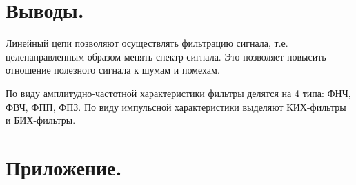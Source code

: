 \documentclass[a4paper,14pt]{extarticle}
\begin{document}

\section{Выводы.}

Линейный цепи позволяют осуществлять фильтрацию сигнала, т.е. целенаправленным образом менять спектр сигнала. Это позволяет повысить отношение полезного сигнала к шумам и помехам.

По виду амплитудно-частотной характеристики фильтры делятся на 4 типа: ФНЧ, ФВЧ, ФПП, ФПЗ.
По виду импульсной характеристики выделяют КИХ-фильтры и БИХ-фильтры.



\section{Приложение.}


\end{document}
